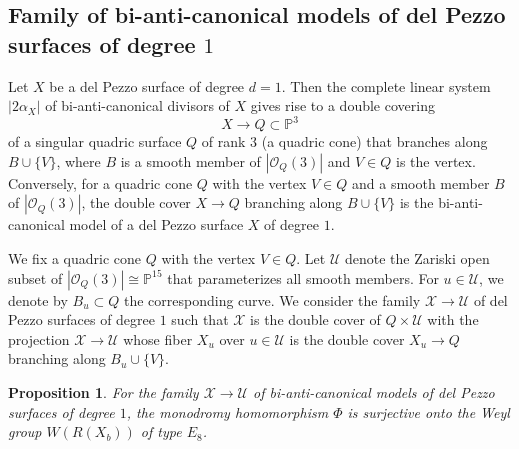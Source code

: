 \documentclass{math}
\theoremstyle{plain}
\newtheorem{proposition}[theorem]{Proposition}
\numberwithin{equation}{section}
\newcommand{\PP}{\mathord{\mathbb  P}}
\newcommand{\OOO}{\mathord{\mathcal O}}
\newcommand{\UUU}{\mathord{\mathcal U}}
\newcommand{\XXX}{\mathord{\mathcal X}}
\newcommand{\mon}{\Phi}
\begin{document}
\subsection{Family of bi-anti-canonical models of del Pezzo surfaces of degree
\texorpdfstring{$1$}{one}}\label{subsec:bianticanonical}
%
Let $X$ be a del Pezzo surface of degree $d=1$.
Then 
the complete linear system $|2\alpha_X| $
of bi-anti-canonical divisors of $X$ gives rise to a double covering
\[
X\to Q\subset\PP^3
\]
of a singular quadric surface $Q$ of rank $3$ (a quadric cone)
that branches along $B\cup\{V\}$,
where $B$ is a smooth member of $|\OOO_{Q}(3)|$ and $V\in Q$ is the vertex.
Conversely, 
for a quadric cone $Q$ with the vertex $V\in Q$ and 
a smooth member $B$ of  $|\OOO_{Q}(3)|$,
the double cover $X\to Q$ branching  along $B\cup\{V\}$
is the bi-anti-canonical model of a del Pezzo surface $X$ of degree $1$.
%
\par
%
We fix 
a quadric cone $Q$ with the vertex $V\in Q$.
Let $\UUU$ denote the Zariski open subset of 
$|\OOO_{Q} (3)|\cong \PP^{15}$
that parameterizes all smooth members.
For $u\in \UUU$,
we denote by  $B_u\subset Q$  the corresponding curve.
We consider the family 
 $\XXX\to \UUU$ 
  of del Pezzo surfaces 
of degree $1$
such that
 $\XXX$ is the double cover of $Q\times \UUU$ with  the  projection  $\XXX\to \UUU$ 
 whose fiber  $X_u$ over $u\in \UUU$
 is the double cover $X_u\to Q$
branching along $B_u\cup \{V\}$.
%
\begin{proposition}\label{prop:WE8}
For the  family 
 $ \XXX\to \UUU$ 
 of bi-anti-canonical models of del Pezzo surfaces of degree $1$,
 the monodromy homomorphism $\mon$
 is surjective onto the Weyl group $W(R(X_b))$ 
 of type $E_8$.
\end{proposition}
%
%
\end{document}
